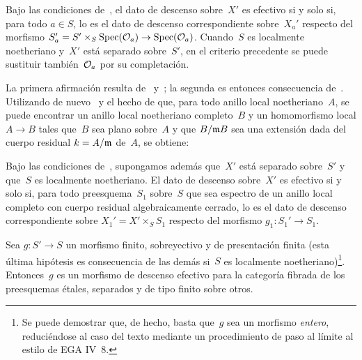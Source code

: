 \begin{corollaire}
\label{IX.4.5}
Bajo las condiciones de~, el dato de descenso sobre~$X'$ es
efectivo si y solo si, para todo $a\in S$, lo es el dato de descenso
correspondiente sobre~$X_a'$ respecto del morfismo
$S_a'=S'\times_S\Spec(\cal{O}_a)\to\Spec(\cal{O}_a)$. Cuando~$S$ es
localmente noetheriano y~$X'$ está separado sobre~$S'$, en el criterio
precedente se puede sustituir también~$\cal{O}_a$ por su completación.
\end{corollaire}

La
primera afirmación resulta de~ y~; la segunda es
entonces consecuencia de~. Utilizando de nuevo~
y el hecho de que, para todo anillo local noetheriano~$A$, se puede
encontrar un anillo local noetheriano completo~$B$ y un homomorfismo local
$A\to B$ tales que~$B$ sea plano sobre~$A$ y que $B/\goth{m}B$ sea una
extensión dada del cuerpo residual $k=A/\goth{m}$ de~$A$, se obtiene:

\begin{corollaire}
\label{IX.4.6}
Bajo las condiciones de~, supongamos además que~$X'$ está
separado sobre~$S'$ y que~$S$ es localmente noetheriano. El dato de
descenso sobre~$X'$ es efectivo si y solo si, para todo preesquema~$S_1$
sobre~$S$ que sea espectro de un anillo local completo con cuerpo residual
algebraicamente cerrado, lo es el dato de descenso correspondiente sobre
$X_1'=X'\times_S S_1$ respecto del morfismo
$g_1\colon S_1'\to S_1$.
\end{corollaire}

\begin{theoreme}
\label{IX.4.7}
Sea $g\colon S'\to S$ un morfismo finito, sobreyectivo y de presentación
finita (esta última hipótesis es consecuencia de las demás si~$S$ es
localmente noetheriano)\footnote{Se puede demostrar que, de hecho, basta
que~$g$ sea un morfismo \emph{entero}, reduciéndose al caso del texto
mediante un procedimiento de paso al límite al estilo de EGA IV~8.}.
Entonces~$g$ es un morfismo de descenso efectivo para la categoría fibrada
de los preesquemas étales, separados y de tipo finito sobre otros.
\end{theoreme}

